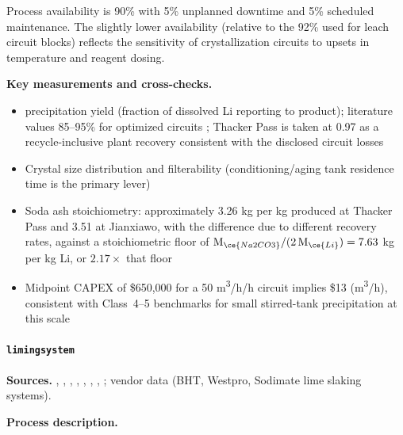 \documentclass{article}
\renewcommand\_{\textunderscore\allowbreak}
\begin{document}
Process availability is 90\% with 5\% unplanned downtime and 5\% scheduled maintenance. The slightly lower availability (relative to the 92\% used for leach circuit blocks) reflects the sensitivity of crystallization circuits to upsets in temperature and reagent dosing.

\medskip
\noindent\textbf{Key measurements and cross-checks.}\quad
\begin{itemize}[noitemsep]
    \item {} precipitation yield (fraction of dissolved Li reporting to product); literature values 85--95\% for optimized circuits \cite{liuProcessAnalysisStudy2021, battagliaRecoveryLithiumCarbonate2022}; Thacker Pass is taken at 0.97 as a recycle-inclusive plant recovery consistent with the disclosed circuit losses
    \item Crystal size distribution and filterability (conditioning/aging tank residence time is the primary lever)
    \item Soda ash stoichiometry: approximately 3.26 kg  per kg  produced at Thacker Pass and 3.51 at Jianxiawo, with the difference due to different recovery rates, against a stoichiometric floor of $\text{M}_{\ce{Na2CO3}} / (2\,\text{M}_{\ce{Li}}) = 7.63$ kg per kg Li, or $2.17\times$ that floor
    \item Midpoint CAPEX of \$650,000 for a 50 \si{m^3/h}/h circuit implies \$13 (\si{m^3/h}), consistent with Class~4--5 benchmarks for small stirred-tank precipitation at this scale
\end{itemize}

\clearpage
\paragraph{\texttt{liming\_system}}\label{app:04-methods-blockdefs-limingsystem}\leavevmode\par

\medskip
\noindent\textbf{Sources.}\quad
\citet{battagliaRecoveryLithiumCarbonate2022}, \citet{liuProcessAnalysisStudy2021}, \citet{khakmardanLifeCycleAssessment2024}, \citet{iyerLifecycleAnalysisLithium2024}, \citet{royLithiumClayAssessing2024}, \citet{sgscanadaincSK1300Technical2024}, \citet{ausimmMonograph27Cost}, \citet{petersPlantDesignEconomics1991}; vendor data (BHT, Westpro, Sodimate lime slaking systems). 

\medskip
\noindent\textbf{Process description.}\quad
\end{document}
